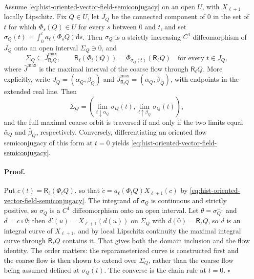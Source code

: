 \label{prop:hist-oriented-semiconjugacy}%
Assume \eqref{eq:hist-oriented-vector-field-semiconjugacy} on an open $U$, with
$X_{\ell+1}$ locally Lipschitz.  Fix $Q\in U$, let $J_Q$ be the connected
component of $0$ in the set of $t$ for which $\Phi_s(Q)\in U$ for every $s$
between $0$ and $t$, and set
$\sigma_Q(t)=\int_0^ta_\ell(\Phi_sQ)\mathrm ds$.  Then $\sigma_Q$ is a strictly
increasing $C^1$ diffeomorphism of $J_Q$ onto an open interval
$\Sigma_Q\ni0$, and
\begin{equation}
\Sigma_Q\subseteq\bar J^{\max}_{\mathsf R_\ell Q},
\qquad
\mathsf R_\ell\left(\Phi_t(Q)\right)
=\bar\Phi_{\sigma_Q(t)}\left(\mathsf R_\ell Q\right)
\quad\text{for every }t\in J_Q,
\label{eq:hist-oriented-flow-semiconjugacy}
\end{equation}
where $\bar J^{\max}$ is the maximal interval of the coarse flow through
$\mathsf R_\ell Q$.  More explicitly, write
$J_Q=(\alpha_Q,\beta_Q)$ and
$\bar J^{\max}_{\mathsf R_\ell Q}=(\bar\alpha_Q,\bar\beta_Q)$, with endpoints
in the extended real line.  Then
\begin{equation}
\Sigma_Q
=\left(
\lim_{t\downarrow\alpha_Q}\sigma_Q(t),
\lim_{t\uparrow\beta_Q}\sigma_Q(t)
\right),
\label{eq:hist-semiconjugacy-endpoint-image}
\end{equation}
and the full maximal coarse orbit is traversed if and only if the two limits
equal $\bar\alpha_Q$ and $\bar\beta_Q$, respectively.  Conversely,
differentiating an oriented flow
semiconjugacy of this form at $t=0$ yields
\eqref{eq:hist-oriented-vector-field-semiconjugacy}.  

\paragraph{Proof.}
Put $c(t)=\mathsf R_\ell(\Phi_tQ)$, so that
$\dot c=a_\ell(\Phi_tQ)X_{\ell+1}(c)$ by
\eqref{eq:hist-oriented-vector-field-semiconjugacy}.  The integrand of
$\sigma_Q$ is continuous and strictly positive, so $\sigma_Q$ is a $C^1$
diffeomorphism onto an open interval.  Let $\theta=\sigma_Q^{-1}$ and
$d=c\circ\theta$; then $d'(u)=X_{\ell+1}(d(u))$ on $\Sigma_Q$ with
$d(0)=\mathsf R_\ell Q$, so $d$ is an integral curve of $X_{\ell+1}$, and by
local Lipschitz continuity the maximal integral curve through
$\mathsf R_\ell Q$ contains it.  That gives both the domain inclusion and the
flow identity.  The order matters: the reparameterized curve is constructed
first and the coarse flow is then shown to extend over $\Sigma_Q$, rather than
the coarse flow being assumed defined at $\sigma_Q(t)$.  The converse is the
chain rule at $t=0$.  $\square$

